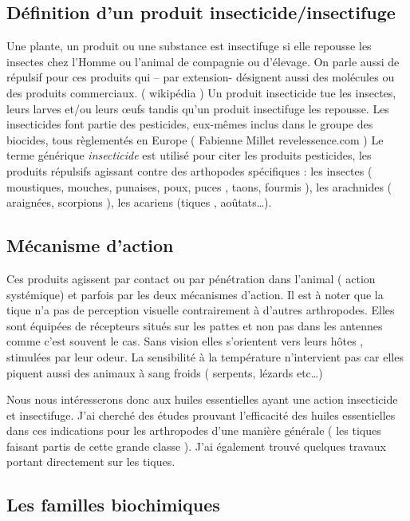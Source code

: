 \documentclass[12pt,a4wide]{article}
\begin{document}
\subsection{Définition d'un produit insecticide/insectifuge}
\label{sec-4-1}
Une plante,  un produit ou  une substance est  insectifuge si elle  repousse les
insectes chez l'Homme  ou l'animal de compagnie ou d'élevage.  On parle aussi de
répulsif pour ces produits qui – par extension- désignent aussi des molécules ou
des produits commerciaux. ( wikipédia ) Un produit insecticide tue les insectes,
leurs larves  et/ou leurs  œufs tandis qu'un  produit insectifuge  les repousse.
Les insecticides font partie des pesticides, eux-mêmes inclus dans le groupe des
biocides, tous  règlementés en  Europe ( Fabienne  Millet revelessence.com  ) Le
terme générique  \emph{insecticide} est utilisé  pour citer les  produits pesticides,
les produits répulsifs agissant contre des arthopodes spécifiques : les insectes
( moustiques, mouches, punaises, poux, puces  , taons, fourmis ), les arachnides
( araignées, scorpions ), les acariens (tiques , aoûtats…).

\subsection{Mécanisme d'action}
\label{sec-4-2}
Ces produits agissent par contact ou par pénétration dans l'animal ( action systémique) et parfois par les deux mécanismes d'action.
Il est à noter que la tique n'a pas de perception visuelle contrairement à d'autres arthropodes. Elles sont équipées de récepteurs situés sur les pattes et non pas dans les antennes comme c'est souvent le cas. Sans vision elles s'orientent vers leurs hôtes , stimulées par leur odeur. La sensibilité à la température n'intervient pas car elles piquent aussi des animaux à sang froids ( serpents, lézards etc\ldots{})



Nous nous intéresserons donc aux huiles essentielles ayant une action insecticide  et insectifuge.
J'ai cherché des études prouvant l'efficacité des huiles essentielles dans ces indications pour les arthropodes d'une manière générale ( les tiques faisant partis de cette grande classe ). J'ai également trouvé quelques travaux portant directement sur les tiques.




\subsection{Les familles biochimiques}
\label{sec-4-3}
\end{document}
